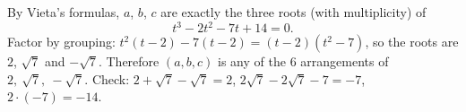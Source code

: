 By Vieta's formulas, $a$, $b$, $c$ are exactly the three roots (with multiplicity) of
\[
t^3-2t^2-7t+14=0 .
\]
Factor by grouping: $t^2(t-2)-7(t-2)=(t-2)(t^2-7)$, so the roots are $2$, $\sqrt7$ and $-\sqrt7$. Therefore $(a,b,c)$ is any of the $\boxed{6}$ arrangements of $\boxed{2,\ \sqrt7,\ -\sqrt7}$. Check: $2+\sqrt7-\sqrt7=2$, $2\sqrt7-2\sqrt7-7=-7$, $2\cdot(-7)=-14$.
